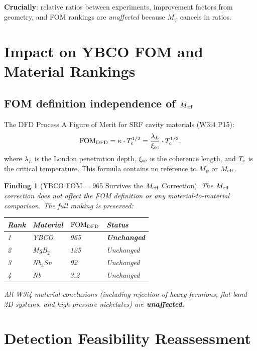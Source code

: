 \documentclass[11pt]{article}
\newtheorem{finding}{Finding}
\newcommand{\Tc}{T_{\rm c}}
\newcommand{\FOM}{\mathrm{FOM}_{\rm DFD}}
\newcommand{\Meff}{M_{\rm eff}}
\newcommand{\Mpsi}{M_\psi}
\begin{document}
\textbf{Crucially}: relative ratios between experiments, improvement
factors from geometry, and FOM rankings are \emph{unaffected} because
$\Mpsi$ cancels in ratios.

\section{Impact on YBCO FOM and Material Rankings}
\label{sec:YBCO-impact}

\subsection{FOM definition independence of $\Meff$}

The DFD Process A Figure of Merit for SRF cavity materials (W3i4 P15):
\begin{equation}
  \FOM = \kappa\cdot\Tc^{1/2} = \frac{\lambda_L}{\xi_{\rm sc}}\cdot\Tc^{1/2},
\end{equation}
where $\lambda_L$ is the London penetration depth, $\xi_{\rm sc}$ is the
coherence length, and $\Tc$ is the critical temperature. This formula
contains no reference to $\Mpsi$ or $\Meff$.

\begin{finding}[YBCO FOM = 965 Survives the $M_{\rm eff}$ Correction]
\label{find:YBCO-FOM}
The $M_{\rm eff}$ correction does not affect the FOM definition or any
material-to-material comparison. The full ranking is preserved:
\begin{center}
\begin{tabular}{llll}
\toprule
Rank & Material & $\FOM$ & Status \\
\midrule
1 & YBCO & 965 & \textbf{Unchanged} \\
2 & MgB$_2$ & 125 & Unchanged \\
3 & Nb$_3$Sn & 92 & Unchanged \\
4 & Nb & 3.2 & Unchanged \\
\bottomrule
\end{tabular}
\end{center}
All W3i4 material conclusions (including rejection of heavy fermions,
flat-band 2D systems, and high-pressure nickelates) are \textbf{unaffected}.
\end{finding}

\section{Detection Feasibility Reassessment}
\label{sec:detection-feasibility}
\end{document}
